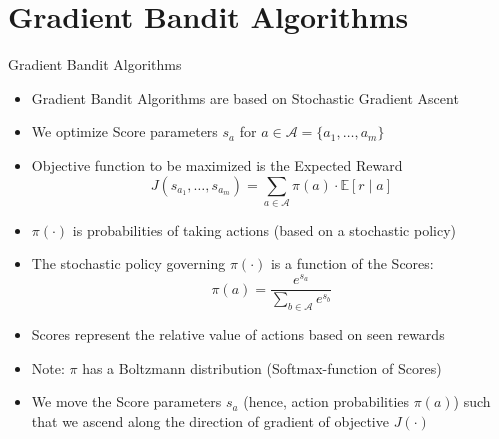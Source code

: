 \section{Gradient Bandit Algorithms}
\begin{frame}[shrink=10]{Gradient Bandit Algorithms}
\begin{itemize}
    \item Gradient Bandit Algorithms are based on Stochastic Gradient Ascent
    \item We optimize Score parameters $s_a$ for $a \in \mathcal{A} = \{a_1, \ldots, a_m\}$
    \item Objective function to be maximized is the Expected Reward
    \[
        J(s_{a_1}, \ldots, s_{a_m}) = \sum_{a \in \mathcal{A}} \pi(a) \cdot \mathbb{E}[r \mid a]
    \]
    \item $\pi(\cdot)$ is probabilities of taking actions (based on a stochastic policy)
    \item The stochastic policy governing $\pi(\cdot)$ is a function of the Scores:
    \[
        \pi(a) = \frac{e^{s_a}}{\sum_{b \in \mathcal{A}} e^{s_b}}
    \]
    \item Scores represent the relative value of actions based on seen rewards
    \item Note: $\pi$ has a Boltzmann distribution (Softmax-function of Scores)
    \item We move the Score parameters $s_a$ (hence, action probabilities $\pi(a)$)
          such that we ascend along the direction of gradient of objective $J(\cdot)$
\end{itemize}
\end{frame}

